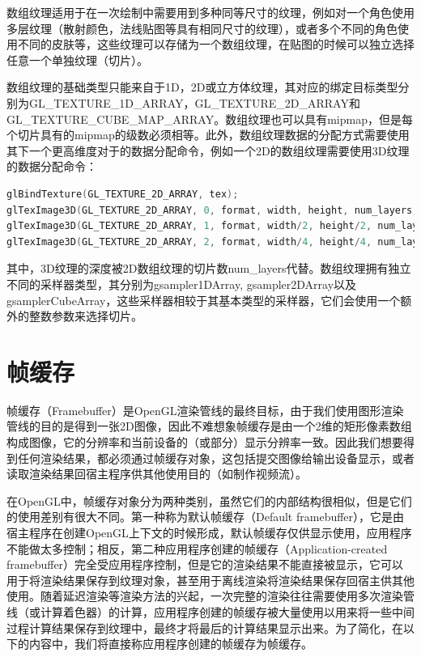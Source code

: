 数组纹理适用于在一次绘制中需要用到多种同等尺寸的纹理，例如对一个角色使用多层纹理（散射颜色，法线贴图等具有相同尺寸的纹理），或者多个不同的角色使用不同的皮肤等，这些纹理可以存储为一个数组纹理，在贴图的时候可以独立选择任意一个单独纹理（切片）。

数组纹理的基础类型只能来自于1D，2D或立方体纹理，其对应的绑定目标类型分别为GL\_TEXTURE\_1D\_ARRAY，GL\_TEXTURE\_2D\_ARRAY和GL\_TEXTURE\_CUBE\_MAP\_ARRAY。数组纹理也可以具有mipmap，但是每个切片具有的mipmap的级数必须相等。此外，数组纹理数据的分配方式需要使用其下一个更高维度对于的数据分配命令，例如一个2D的数组纹理需要使用3D纹理的数据分配命令：


\begin{lstlisting}[language=C++]
glBindTexture(GL_TEXTURE_2D_ARRAY, tex);
glTexImage3D(GL_TEXTURE_2D_ARRAY, 0, format, width, height, num_layers, ...);
glTexImage3D(GL_TEXTURE_2D_ARRAY, 1, format, width/2, height/2, num_layers, ...);
glTexImage3D(GL_TEXTURE_2D_ARRAY, 2, format, width/4, height/4, num_layers, ...);
\end{lstlisting}

其中，3D纹理的深度被2D数组纹理的切片数num\_layers代替。数组纹理拥有独立不同的采样器类型，其分别为gsampler1DArray​, gsampler2DArray​以及gsamplerCubeArray，这些采样器相较于其基本类型的采样器，它们会使用一个额外的整数参数来选择切片。​





\section{帧缓存}\label{sec:api-framebuffer}
帧缓存（Framebuffer）是OpenGL渲染管线的最终目标，由于我们使用图形渲染管线的目的是得到一张2D图像，因此不难想象帧缓存是由一个2维的矩形像素数组构成图像，它的分辨率和当前设备的（或部分）显示分辨率一致。因此我们想要得到任何渲染结果，都必须通过帧缓存对象，这包括提交图像给输出设备显示，或者读取渲染结果回宿主程序供其他使用目的（如制作视频流）。

在OpenGL中，帧缓存对象分为两种类别，虽然它们的内部结构很相似，但是它们的使用差别有很大不同。第一种称为默认帧缓存（Default framebuffer），它是由宿主程序在创建OpenGL上下文的时候形成，默认帧缓存仅供显示使用，应用程序不能做太多控制；相反，第二种应用程序创建的帧缓存（Application-created framebuffer）完全受应用程序控制，但是它的渲染结果不能直接被显示，它可以用于将渲染结果保存到纹理对象，甚至用于离线渲染将渲染结果保存回宿主供其他使用。随着延迟渲染等渲染方法的兴起，一次完整的渲染往往需要使用多次渲染管线（或计算着色器）的计算，应用程序创建的帧缓存被大量使用以用来将一些中间过程计算结果保存到纹理中，最终才将最后的计算结果显示出来。为了简化，在以下的内容中，我们将直接称应用程序创建的帧缓存为帧缓存。

